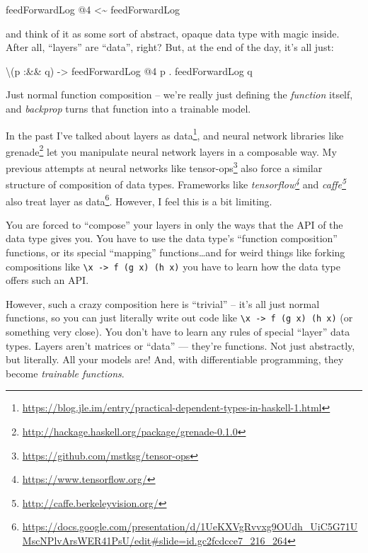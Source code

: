 \documentclass[]{article}
\newenvironment{Shaded}{}{}
\newcommand{\DecValTok}[1]{\textcolor[rgb]{0.25,0.63,0.44}{#1}}
\newcommand{\NormalTok}[1]{#1}
\newcommand{\OperatorTok}[1]{\textcolor[rgb]{0.40,0.40,0.40}{#1}}
\newcommand{\OtherTok}[1]{\textcolor[rgb]{0.00,0.44,0.13}{#1}}
\renewcommand{\href}[2]{#2\footnote{\url{#1}}}
\begin{document}
\begin{Shaded}
\begin{Highlighting}[]
\NormalTok{feedForwardLog }\OperatorTok{@}\DecValTok{4} \OperatorTok{\textless{}\textasciitilde{}}\NormalTok{ feedForwardLog}
\end{Highlighting}
\end{Shaded}

and think of it as some sort of abstract, opaque data type with magic inside.
After all, ``layers'' are ``data'', right? But, at the end of the day, it's all
just:

\begin{Shaded}
\begin{Highlighting}[]
\NormalTok{\textbackslash{}(p }\OperatorTok{:\&\&}\NormalTok{ q) }\OtherTok{{-}\textgreater{}}\NormalTok{ feedForwardLog }\OperatorTok{@}\DecValTok{4}\NormalTok{ p }\OperatorTok{.}\NormalTok{ feedForwardLog q}
\end{Highlighting}
\end{Shaded}

Just normal function composition -- we're really just defining the
\emph{function} itself, and \emph{backprop} turns that function into a trainable
model.

In the past I've talked about
\href{https://blog.jle.im/entry/practical-dependent-types-in-haskell-1.html}{layers
as data}, and neural network libraries like
\href{http://hackage.haskell.org/package/grenade-0.1.0}{grenade} let you
manipulate neural network layers in a composable way. My previous attempts at
neural networks like \href{https://github.com/mstksg/tensor-ops}{tensor-ops}
also force a similar structure of composition of data types. Frameworks like
\emph{\href{https://www.tensorflow.org/}{tensorflow}} and
\emph{\href{http://caffe.berkeleyvision.org/}{caffe}} also treat
\href{https://docs.google.com/presentation/d/1UeKXVgRvvxg9OUdh_UiC5G71UMscNPlvArsWER41PsU/edit\#slide=id.gc2fcdcce7_216_264}{layer
as data}. However, I feel this is a bit limiting.

You are forced to ``compose'' your layers in only the ways that the API of the
data type gives you. You have to use the data type's ``function composition''
functions, or its special ``mapping'' functions\ldots and for weird things like
forking compositions like
\texttt{\textbackslash{}x\ -\textgreater{}\ f\ (g\ x)\ (h\ x)} you have to learn
how the data type offers such an API.

However, such a crazy composition here is ``trivial'' -- it's all just normal
functions, so you can just literally write out code like
\texttt{\textbackslash{}x\ -\textgreater{}\ f\ (g\ x)\ (h\ x)} (or something
very close). You don't have to learn any rules of special ``layer'' data types.
Layers aren't matrices or ``data'' --- they're functions. Not just abstractly,
but literally. All your models are! And, with differentiable programming, they
become \emph{trainable functions}.
\end{document}
